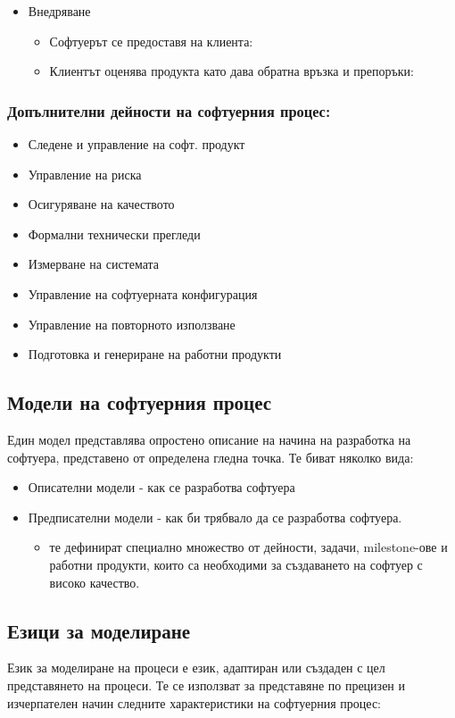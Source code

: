 \documentclass[fleqn,12pt]{article}
\begin{document}
\begin{itemize}
	\item Внедряване
	\begin{itemize}
		\item Софтуерът се предоставя на клиента:
		\item Клиентът оценява продукта като дава обратна връзка и препоръки:
	\end{itemize}
\end{itemize}

\subsubsection{Допълнителни дейности на софтуерния процес:}
\begin{itemize}
	\item Следене и управление на софт. продукт
	\item Управление на риска
	\item Осигуряване на качеството
	\item Формални технически прегледи
	\item Измерване на системата
	\item Управление на софтуерната конфигурация
	\item Управление на повторното използване
	\item Подготовка и генериране на работни продукти
\end{itemize}

\subsection{Модели на софтуерния процес}
Един модел представлява опростено описание на начина на разработка на софтуера, представено от определена гледна точка. Те биват няколко вида:

\begin{itemize}
	\item Описателни модели - как се разработва софтуера
	\item Предписателни модели - как би трябвало да се разработва софтуера.
	\begin{itemize}
		\item те дефинират специално множество от дейности, задачи, milestone-ове и работни продукти, които са необходими за създаването на софтуер с високо качество.
	\end{itemize}
\end{itemize}

\subsection{Езици за  моделиране}
Език за моделиране на процеси е език, адаптиран или създаден с цел представянето на процеси. Те се използват за представяне по прецизен и изчерпателен начин следните характеристики на софтуерния процес:
 
\end{document}
